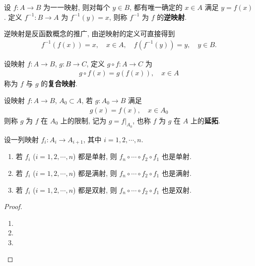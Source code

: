 \documentclass[../../main.tex]{subfiles}
\begin{document}
\begin{definition}[逆映射]
设 $f : A \to B$ 为一一映射, 则对每个 $y \in B$, 都有唯一确定的 $x \in A$ 满足 $y = f(x)$. 定义 $f^{-1} : B \to A$ 为 $f^{-1}(y) = x$, 则称 $f^{-1}$ 为 $f$ 的\textbf{逆映射}.
    
\end{definition}
\begin{note}
逆映射是反函数概念的推广, 由逆映射的定义可直接得到
\begin{align*}
f^{-1}(f(x)) = x, \quad x \in A,\quad
f(f^{-1}(y)) = y, \quad y \in B.
\end{align*} 
\end{note}

\begin{definition}[复合映射和映射的延拓]
设映射 $f : A \to B$, $g : B \to C$, 定义 $g \circ f : A \to C$ 为
\begin{align*}
g \circ f(x) = g(f(x)), \quad x \in A
\end{align*}
称为 $f$ 与 $g$ 的\textbf{复合映射}.

设映射 $f : A \to B$, $A_0 \subset A$, 若 $g : A_0 \to B$ 满足
\begin{align*}
g(x) = f(x), \quad x \in A_0
\end{align*}
则称 $g$ 为 $f$ 在 $A_0$ 上的限制, 记为 $g = f|_{A_0}$, 也称 $f$ 为 $g$ 在 $A$ 上的\textbf{延拓}. 
\end{definition}

\begin{proposition}\label{proposition:映射的复合保持单射、满射和双射}
设一列映射 $f_i:A_i\rightarrow A_{i + 1}$, 其中 $i = 1, 2, \cdots, n$.
\begin{enumerate}[(1)]
\item 若 $f_i$ ($i = 1, 2, \cdots, n$) 都是单射, 则 $f_n\circ \cdots \circ f_2\circ f_1$ 也是单射.
\item 若 $f_i$ ($i = 1, 2, \cdots, n$) 都是满射, 则 $f_n\circ \cdots \circ f_2\circ f_1$ 也是满射.
\item 若 $f_i$ ($i = 1, 2, \cdots, n$) 都是双射, 则 $f_n\circ \cdots \circ f_2\circ f_1$ 也是双射.
\end{enumerate} 
\end{proposition}
\begin{proof}
\begin{enumerate}[(1)]
\item 

\item 

\item 
\end{enumerate}

\end{proof}
\end{document}
